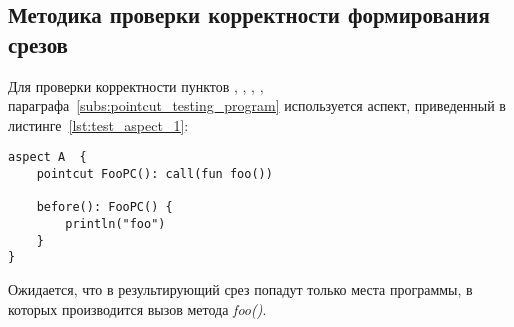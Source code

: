\subsection{Методика проверки корректности формирования срезов}
\label{sub:pointcut_building_methodology}
Для проверки корректности пунктов
\quotes{\ref{list:method_name_check}},
\quotes{\ref{list:class_name_check}},
\quotes{\ref{list:method_params_check}},
\quotes{\ref{list:call_check}},
\quotes{\ref{list:reference_pointcut_check}} параграфа~\ref{subs:pointcut_testing_program} используется аспект, приведенный в листинге~\ref{lst:test_aspect_1}:
\begin{lstlisting}[style={java}, label={lst:test_aspect_1},
  caption={Пример тестового аспекта}]
aspect A  {
    pointcut FooPC(): call(fun foo())

    before(): FooPC() {
        println("foo")
    }
}
\end{lstlisting}

Ожидается, что в результирующий срез попадут только места программы, в которых производится вызов метода \textit{foo()}.

